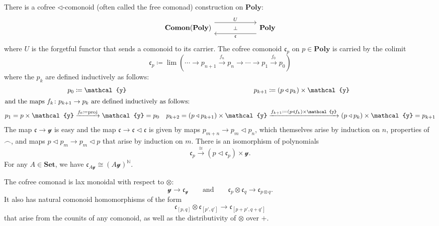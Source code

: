 \documentclass[11pt, one side, article]{memoir}
\theoremstyle{definition}
\theoremstyle{plain}
\newcommand{\Cat}[1]{\mathbf{#1}}%
\newcommand{\To}[2][]{\xrightarrow[#1]{#2}}
\newcommand{\tn}[1]{\textnormal{#1}}
\newcommand{\nn}{\mathbb{N}}
\newcommand{\smset}{\Cat{Set}}
\newcommand{\yon}{\mathcal{y}}
\newcommand{\poly}{\Cat{Poly}}
\newcommand{\0}{\textsf{0}}
\newcommand{\1}{\tn{\textsf{1}}}
\newcommand{\tri}{\mathbin{\triangleleft}}
\newcommand{\cofree}{\mathfrak{c}}
\newcommand{\qqand}{\qquad\text{and}\qquad}
\begin{document}
There is a cofree $\tri$-comonoid (often called the free comonad) construction on $\poly$:
\begin{equation}
\begin{tikzcd}[column sep=60pt]
	\Cat{Comon}(\poly)
  	\ar[from=r, shift left=8pt, "\cofree"]
		\ar[from=r, phantom, "\scriptstyle\bot"]
  	&
	\poly
		\ar[from=l, shift right=-8pt, "U"]
\end{tikzcd}
\end{equation}
where $U$ is the forgetful functor that sends a comonoid to its carrier. The cofree comonoid $\cofree_p$ on $p\in\poly$ is carried by the colimit
\begin{equation}
\cofree_p\coloneqq\lim(\cdots\to p_{n+1}\To{f_n} p_n\to\cdots\to p_1\To{f_0} p_0)
\end{equation}
where the $p_k$ are defined inductively as follows:
\begin{align}
	p_0&\coloneqq\yon&p_{k+1}&\coloneqq (p\tri p_k)\times\yon\\
\intertext{and the maps $f_k\colon p_{k+1}\to p_k$ are defined inductively as follows:}
	p_1=p\times\yon&\To{f_0\coloneqq\tn{proj}}\yon=p_0&p_{k+2}=(p\tri p_{k+1})\times\yon&\To{f_{k+1}\coloneqq(p\tri f_k)\times\yon}(p\tri p_{k})\times\yon=p_{k+1}
\end{align}
The map $\cofree\to\yon$ is easy and the map $\cofree\to\cofree\tri\cofree$ is given by maps $p_{m+n}\to p_m\tri p_n$, which themselves arise by induction on $n$, properties of $\frown$, and maps $p\tri p_m\to p_m\tri p$ that  arise by induction on $m$. There is an isomorphism of polynomials
\begin{equation}
	\cofree_p\To{\cong} (p\tri\cofree_p)\times\yon.
\end{equation}
For any $A\in\smset$, we have $\cofree_{A\yon}\cong(A\yon)^\nn$.

The cofree comonad is lax monoidal with respect to $\otimes$:
\begin{equation}
  \yon\to\cofree_\yon
  \qqand
  \cofree_p\otimes\cofree_q\to\cofree_{p\otimes q}.
\end{equation}
It also has natural comonoid homomorphisms of the form
\begin{equation}
	\cofree_{[p,q]}\otimes\cofree_{[p',q']}\to\cofree_{[p+p',q+q']}
\end{equation}
that arise from the counits of any comonoid, as well as the distributivity of $\otimes$ over $+$.
\end{document}
